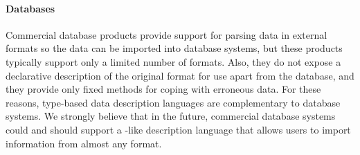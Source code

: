 


\paragraph*{Databases}
Commercial database products provide support for
parsing data in external formats so the data can be imported into
database systems, but these products typically support only a limited number of
formats.  Also, they do not expose a declarative description of the
original format for use apart from the database, and they
provide only fixed methods for coping with erroneous data.  For these reasons,
type-based data description languages are complementary to database systems.  We strongly believe that
in the future, commercial database systems could and should support a 
\pads{}-like description language that allows users to import information from
almost any format.

